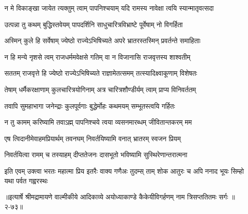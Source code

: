 \twolineshloka
{न मे विकाङ्खा जायेत त्यक्तुम् त्वाम् पापनिश्चयाम्}
{यदि रामस्य नावेक्षा त्वयि स्यान्मातृवत्सदा} %

\twolineshloka
{उत्पन्ना तु कथम् बुद्धिस्तवेयम् पापदर्शिनि}
{साधुचारित्रविभ्राष्टे पूर्वेषाम् नो विगर्हिता} %

\twolineshloka
{अस्मिन् कुले हि सर्वेषाम् ज्येष्ठो राज्येऽभिषिच्यते}
{अपरे भ्रातरस्तस्मिन् प्रवर्तन्ते समाहिताः} %

\twolineshloka
{न हि मन्ये नृशसे त्वम् राजधर्ममवेक्षसे}
{गतिम् वा न विजानासि राजवृत्तस्य शाश्वतीम्} %

\twolineshloka
{सततम् राजवृत्ते हि ज्येष्ठो राज्येऽभिषिच्यते}
{राज्ञामेतत्समम् तत्स्यादिक्ष्वाकूणाम् विशेषतः} %

\twolineshloka
{तेषाम् धर्मैकरक्षाणाम् कुलचारित्रयोगिनाम्}
{अत्र चारित्रशौण्डीर्यम् त्वाम् प्राप्य विनिवर्ततम्} %

\twolineshloka
{तवापि सुमहाभागा जनेन्द्राः कुलपूर्वगाः}
{बुद्धेर्मोहः कथमयम् सम्भूतस्त्वयि गर्हितः} %

\twolineshloka
{न तु कामम् करिष्यामि तवाऽह्म् पापनिश्चये}
{त्वया व्यसनमारब्धम् जीवितान्तकरम् मम} %

\twolineshloka
{एष त्विदानीमेवाहमप्रियार्थम् तवनघम्}
{निवर्तयिष्यामि वनात् भ्रातरम् स्वजन प्रियम्} %

\twolineshloka
{निवर्तयित्वा रामम् च तस्याहम् दीप्ततेजनः}
{दासभूतो भविष्यामि सुस्थिरेणान्तरात्मना} %

\fourlineindentedshloka
{इति एवम् उक्त्वा भरतः महात्मा}
{प्रिय इतरैः वाक्य गणैअः तुदम्स् ताम्}
{शोक आतुरः च अपि ननाद भूयः}
{सिम्हो यथा पर्वत गह्वरस्थः} %


॥इत्यार्षे श्रीमद्रामायणे वाल्मीकीये आदिकाव्ये अयोध्याकाण्डे कैकेयीविगर्हणम् नाम त्रिसप्ततितमः सर्गः ॥२-७३॥
